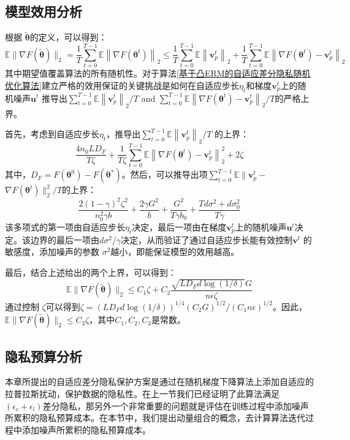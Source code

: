 \subsection{模型效用分析}
根据 $\widetilde{\boldsymbol{\theta}}$的定义，可以得到：
$$
\mathbb{E}\|\nabla F(\widetilde{\boldsymbol{\theta}})\|_{2}=\frac{1}{T} \sum_{t=0}^{T-1} \mathbb{E}\left\|\nabla F\left(\boldsymbol{\theta}^{t}\right)\right\|_{2} \leq \frac{1}{T} \sum_{t=0}^{T-1} \mathbb{E}\left\|\mathbf{v}_{p}^{t}\right\|_{2}+\frac{1}{T} \sum_{t=0}^{T-1} \mathbb{E}\left\|\nabla F\left(\boldsymbol{\theta}^{t}\right)-\mathbf{v}_{p}^{t}\right\|_{2}
$$
其中期望值覆盖算法的所有随机性。对于算法\ref{基于凸ERM的自适应差分隐私随机优化算法}建立严格的效用保证的关键挑战是如何在自适应步长$\eta_{t}$和梯度$\mathbf{v}_{p}^{t}$上的随机噪声$\mathbf{u}^{t}$
推导出$\sum_{t=0}^{T-1} \mathbb{E}\left\|\mathbf{v}_{p}^{t}\right\|_{2} / T$ and $\sum_{t=0}^{T-1} \mathbb{E}\left\|\nabla F\left(\boldsymbol{\theta}^{t}\right)-\mathbf{v}_{p}^{t}\right\|_{2} / T$的严格上界。

首先，考虑到自适应步长$\eta_{t}$，推导出$\sum_{t=0}^{T-1} \mathbb{E}\left\|\mathbf{v}_{p}^{t}\right\|_{2} / T$ 的上界：
$$
\frac{4 n_{0} L D_{F}}{T \zeta}+\frac{1}{T \zeta} \sum_{t=0}^{T-1} \mathbb{E}\left\|\nabla F\left(\boldsymbol{\theta}^{t}\right)-\mathbf{v}_{p}^{t}\right\|_{2}^{2}+2 \zeta
$$
其中，$D_{F}=F\left(\boldsymbol{\theta}^{0}\right)-F\left(\boldsymbol{\theta}^{*}\right)$。然后，可以推导出项$\sum_{t=0}^{T-1} \mathbb{E} \| \mathbf{v}_{p}^{t}-$ $\nabla F\left(\boldsymbol{\theta}^{t}\right) \|_{2}^{2} / T$的上界：
$$
\frac{2(1-\gamma)^{2} \zeta^{2}}{n_{0}^{2} \gamma b}+\frac{2 \gamma G^{2}}{b}+\frac{G^{2}}{T \gamma b_{0}}+\frac{T d \sigma^{2}+d \sigma_{0}^{2}}{T \gamma}
$$
该多项式的第一项由自适应步长$\eta_{t}$决定，最后一项由在梯度$\mathbf{v}_{p}^{t}$上的随机噪声$\mathbf{u}^{t}$决定。该边界的最后一项由$d \sigma^{2} / \gamma$决定，从而验证了通过自适应步长能有效控制$\mathbf{v}^{t}$ 的敏感度，添加噪声的参数 $\sigma^{2}$越小，即能保证模型的效用越高。

最后，结合上述给出的两个上界，可以得到：
$$
\mathbb{E}\|\nabla F(\widetilde{\boldsymbol{\theta}})\|_{2} \leq C_{1} \zeta+C_{2} \frac{\sqrt{L D_{F} d \log (1 / \delta)} G}{n \epsilon \zeta}
$$
通过控制 $\zeta$可以得到$\zeta=\left(L D_{F} d \log (1 / \delta)\right)^{1 / 4}\left(C_{2} G\right)^{1 / 2} /\left(C_{1} n \epsilon\right)^{1 / 2}$。因此，$\mathbb{E}\|\nabla F(\widetilde{\boldsymbol{\theta}})\|_{2} \leq C_{3} \zeta$，其中$C_{1}, C_{2}, C_{3}$是常数。

\subsection{隐私预算分析}
本章所提出的自适应差分隐私保护方案是通过在随机梯度下降算法上添加自适应的拉普拉斯扰动，保护数据的隐私性。在上一节我们已经证明了此算法满足$\left(\epsilon_{c}+\epsilon_{l}\right)$差分隐私，那另外一个非常重要的问题就是评估在训练过程中添加噪声所累积的隐私预算成本。在本节中，我们提出动量组合的概念，去计算算法迭代过程中添加噪声所累积的隐私预算成本。

